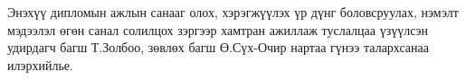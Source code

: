 
\begin{acknowledgements}
\addchaptertocentry{\acknowledgementname}

Энэхүү дипломын ажлын санааг олох, хэрэгжүүлэх үр дүнг боловсруулах, нэмэлт мэдээлэл өгөн санал солилцох зэргээр хамтран ажиллаж туслалцаа үзүүлсэн удирдагч багш Т.Золбоо, зөвлөх багш Ө.Сүх-Очир нартаа гүнээ талархсанаа илэрхийлье.

\end{acknowledgements}


